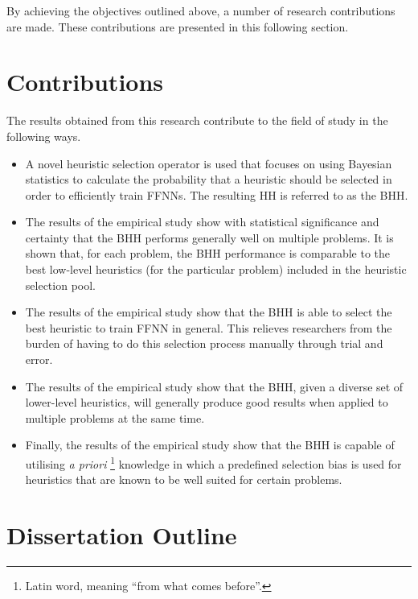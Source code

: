 \noindent
By achieving the objectives outlined above, a number of research contributions are made. These contributions are presented in this following section.


\section{Contributions}\label{sec:introduction:contributions}

The results obtained from this research contribute to the field of study in the
following ways.

\begin{itemize}
      \item A novel heuristic selection operator is used that focuses on using Bayesian statistics to calculate the probability that a heuristic should be selected in order to efficiently train \acp{FFNN}. The resulting \ac{HH} is referred to as the \Acl{BHH}.

      \item The results of the empirical study show with statistical significance and certainty that the \Ac{BHH} performs generally well on multiple problems. It is shown that, for each problem, the \Ac{BHH} performance is comparable to the best low-level heuristics (for the particular problem) included in the heuristic selection pool.

      \item The results of the empirical study show that the \Ac{BHH} is able to select the best heuristic to train \ac{FFNN} in general. This relieves researchers from the burden of having to do this selection process manually through trial and error.

      \item The results of the empirical study show that the \Ac{BHH}, given a diverse set of lower-level heuristics, will generally produce good results when applied to multiple problems at the same time.

      \item Finally, the results of the empirical study show that the \Ac{BHH} is capable of utilising \textit{a priori} \footnote{Latin word, meaning ``from what comes before''.} knowledge in which a predefined selection bias is used for heuristics that are known to be well suited for certain problems.
\end{itemize}


\section{Dissertation Outline}\label{sec:introduction:outline}

